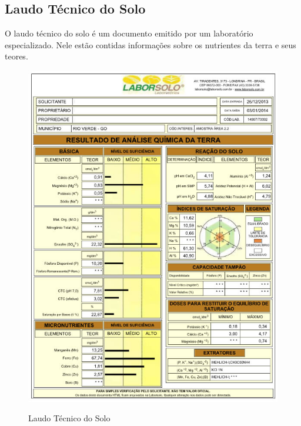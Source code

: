 \begin{anexosenv}
\chapter{Laudo Técnico do Solo}
\label{chap:laudodosolo}

O laudo técnico do solo é um documento emitido por um laboratório especializado. Nele estão contidas informações sobre os nutrientes da terra e seus teores.

\begin{figure}[H]
    \centering
    \caption{Laudo Técnico do Solo}
    \includegraphics[width=13cm]{./dados/figuras/ex_analise_quimica.jpg}
    \label{fig:laudotecnico}
\end{figure}


\end{anexosenv}
